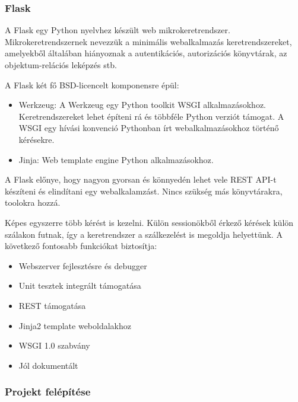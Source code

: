 \subsubsection{Flask}

A Flask egy Python nyelvhez készült web mikrokeretrendszer. Mikrokeretrendszernek nevezzük a minimális webalkalmazás keretrendszereket, amelyekből általában hiányoznak a autentikációs, autorizációs könyvtárak, az objektum-relációs leképzés stb.

A Flask két fő BSD-licencelt komponensre épül:

\begin{itemize}
	\item Werkzeug: A Werkzeug egy Python toolkit WSGI alkalmazásokhoz. Keretrendszereket lehet építeni rá és többféle Python verziót támogat. A WSGI egy hívási konvenció Pythonban írt webalkalmazásokhoz történő kérésekre.
	\item Jinja: Web template engine Python alkalmazásokhoz.
\end{itemize}

A Flask előnye, hogy nagyon gyorsan és könnyedén lehet vele REST API-t készíteni és elindítani egy webalkalamzást. Nincs szükség más könyvtárakra, toolokra hozzá.

Képes egyszerre több kérést is kezelni. Külön sessionökből érkező kérések külön szálakon futnak, így a keretrendszer a szálkezelést is megoldja helyettünk. A következő fontosabb funkciókat biztosítja:

\begin{itemize}
	\item Webszerver fejlesztésre és debugger
	\item Unit tesztek integrált támogatása
	\item REST támogatása
	\item Jinja2 template weboldalakhoz
	\item WSGI 1.0 szabvány
	\item Jól dokumentált
\end{itemize}

\subsubsection{Projekt felépítése}

